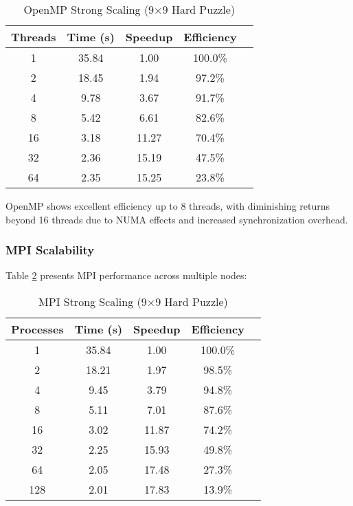 \begin{table}[htbp]
\caption{OpenMP Strong Scaling (9×9 Hard Puzzle)}
\begin{center}
\begin{tabular}{@{}ccccc@{}}
\toprule
\textbf{Threads} & \textbf{Time (s)} & \textbf{Speedup} & \textbf{Efficiency} \\
\midrule
1 & 35.84 & 1.00 & 100.0\% \\
2 & 18.45 & 1.94 & 97.2\% \\
4 & 9.78 & 3.67 & 91.7\% \\
8 & 5.42 & 6.61 & 82.6\% \\
16 & 3.18 & 11.27 & 70.4\% \\
32 & 2.36 & 15.19 & 47.5\% \\
64 & 2.35 & 15.25 & 23.8\% \\
\bottomrule
\end{tabular}
\end{center}
\label{tab:openmp_scaling}
\end{table}

OpenMP shows excellent efficiency up to 8 threads, with diminishing returns beyond 16 threads due to NUMA effects and increased synchronization overhead.

\subsubsection{MPI Scalability}
Table \ref{tab:mpi_scaling} presents MPI performance across multiple nodes:

\begin{table}[htbp]
\caption{MPI Strong Scaling (9×9 Hard Puzzle)}
\begin{center}
\begin{tabular}{@{}ccccc@{}}
\toprule
\textbf{Processes} & \textbf{Time (s)} & \textbf{Speedup} & \textbf{Efficiency} \\
\midrule
1 & 35.84 & 1.00 & 100.0\% \\
2 & 18.21 & 1.97 & 98.5\% \\
4 & 9.45 & 3.79 & 94.8\% \\
8 & 5.11 & 7.01 & 87.6\% \\
16 & 3.02 & 11.87 & 74.2\% \\
32 & 2.25 & 15.93 & 49.8\% \\
64 & 2.05 & 17.48 & 27.3\% \\
128 & 2.01 & 17.83 & 13.9\% \\
\bottomrule
\end{tabular}
\end{center}
\label{tab:mpi_scaling}
\end{table}

